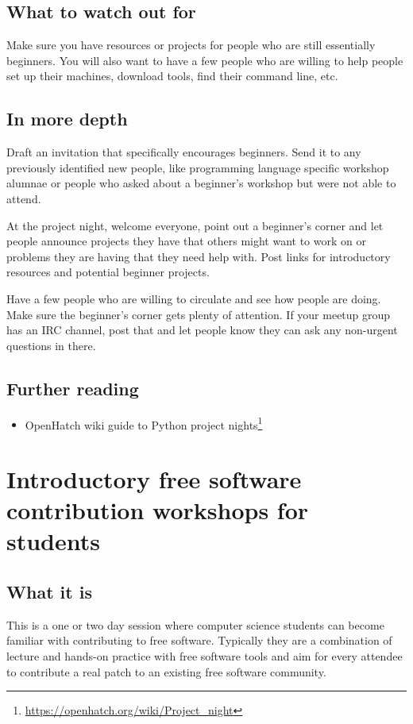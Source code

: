 \subsection{What to watch out for}
Make sure you have resources or projects for people who are still essentially beginners. You will also want to have a few people who are willing to help people set up their machines, download tools, find their command line, etc. 

\subsection{In more depth}
Draft an invitation that specifically encourages beginners. Send it to any previously identified new people, like programming language specific workshop alumnae or people who asked about a beginner’s workshop but were not able to attend. 

At the project night, welcome everyone, point out a beginner’s corner and let people announce projects they have that others might want to work on or problems they are having that they need help with. Post links for introductory resources and potential beginner projects.

Have a few people who are willing to circulate and see how people are doing. Make sure the beginner’s corner gets plenty of attention. If your meetup group has an IRC channel, post that and let people know they can ask any non-urgent questions in there.  

\subsection{Further reading}
\begin{itemize}
 \item OpenHatch wiki guide to Python project nights\footnote{\url{https://openhatch.org/wiki/Project_night}}
\end{itemize}

\section{Introductory free software contribution workshops for students}
\subsection{What it is}
This is a one or two day session where computer science students can become familiar with contributing to free software. Typically they are a combination of lecture and hands-on practice with free software tools and aim for every attendee to contribute a real patch to an existing free software community.

